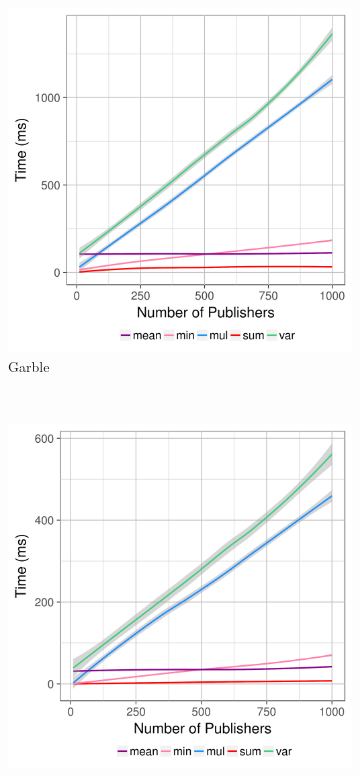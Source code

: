 \begin{figure}
    \centering
    \begin{subfigure}[b]{0.32\textwidth}
        \includegraphics[width=\textwidth]{plots/garble.png}
        \caption{Garble}
        \label{fig:micro-garble-time}
    \end{subfigure}
    ~ %
    \begin{subfigure}[b]{0.32\textwidth}
        \includegraphics[width=\textwidth]{plots/eval.png}

\end{subfigure}
\end{figure}
